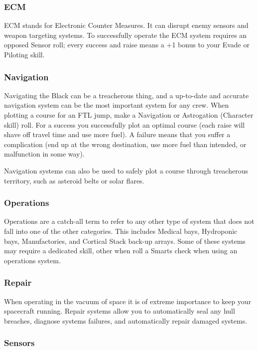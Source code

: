 \begin{multicols}{2}
\subsubsection{ECM}

ECM stands for Electronic Counter Measures. It can disrupt enemy sensors and weapon targeting systems. To successfully operate the ECM system requires an opposed Sensor roll; every success and raise means a +1 bonus to your Evade or Piloting skill.

\subsubsection{Navigation}

Navigating the Black can be a treacherous thing, and a up-to-date and accurate navigation system can be the most important system for any crew. When plotting a course for an FTL jump, make a Navigation or Astrogation (Character skill) roll. For a success you successfully plot an optimal course (each raise will shave off travel time and use more fuel). A failure means that you suffer a complication (end up at the wrong destination, use more fuel than intended, or malfunction in some way). 

Navigation systems can also be used to safely plot a course through treacherous territory, such as asteroid belts or solar flares.

\subsubsection{Operations}

Operations are a catch-all term to refer to any other type of system that does not fall into one of the other categories. This includes Medical bays, Hydroponic bays, Manufactories, and Cortical Stack back-up arrays. Some of these systems may require a dedicated skill, other when roll a Smarts check when using an operations system.

\subsubsection{Repair}

When operating in the vacuum of space it is of extreme importance to keep your spacecraft running. Repair systems allow you to automatically seal any hull breaches, diagnose systems failures, and automatically repair damaged systems.

\subsubsection{Sensors}


\end{multicols}
